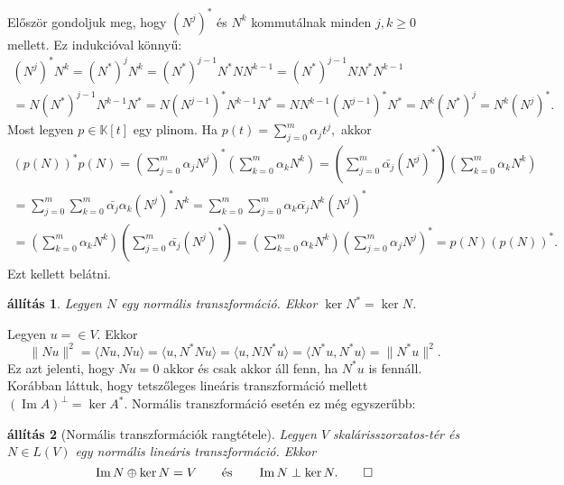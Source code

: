 \documentclass[9pt, a4paper, showtrims]{memoir}
\makeatletter
\renewenvironment{proof}[1][\proofname]
    {\par\pushQED{\qed}%
    \normalfont \topsep6\p@\@plus6\p@\relax
    \trivlist
    \item[\hskip\labelsep
        \itshape
    #1\@addpunct{:}]\ignorespaces}
    {\popQED\endtrivlist\@endpefalse}
\theoremstyle{plain}
\newtheorem{proposition}{állítás}[chapter]
\theoremstyle{remark}
\theoremstyle{definition}
\DeclareMathOperator{\im}{Im}
\newcommand{\ip}[2]{\langle#1,#2\rangle}
\makeatother
\begin{document}
\begin{proof}
    Először gondoljuk meg, hogy $(N^j)^\ast$ és $N^k$ kommutálnak minden $j,k≥0$ mellett.
    Ez indukcióval könnyű:
    \begin{multline*}
        (N^j)^\ast N^k
        =
        (N^\ast)^jN^k
        =
        (N^\ast)^{j-1}N^\ast NN^{k-1}
        =
        (N^\ast)^{j-1}NN^\ast N^{k-1}
        \\
        =
        N(N^\ast)^{j-1}N^{k-1}N^\ast
        =
        N(N^{j-1})^\ast N^{k-1}N^\ast
        =
        NN^{k-1}(N^{j-1})^\ast N^\ast
        =
        N^k(N^\ast)^j
        =
        N^k(N^j)^\ast.
    \end{multline*}
    Most legyen $p\in \mathbb{K}[t]$ egy plinom.
    Ha $p\left( t \right)=\sum_{j=0}^m\alpha_jt^j,$
    akkor
    \begin{multline*}
        \left( p\left( N \right) \right)^\ast p\left( N \right)
        =
        \left( \sum_{j=0}^m\alpha_jN^j \right)^\ast
         \left( \sum_{k=0}^m\alpha_kN^k \right)
        =
        \left( \sum_{j=0}^m\bar{\alpha_j}(N^j)^\ast \right)
        \left( \sum_{k=0}^m\alpha_kN^k \right)
        \\
        =
        \sum_{j=0}^m\sum_{k=0}^m\bar{\alpha_j}\alpha_k(N^j)^\ast N^k
        =
        \sum_{k=0}^m\sum_{j=0}^m\alpha_k\bar{\alpha_j}N^k(N^j)^\ast
        \\
        =
        \left( \sum_{k=0}^m\alpha_kN^k \right)
        \left( \sum_{j=0}^m\bar{\alpha_j}(N^j)^\ast \right)
        =
        \left( \sum_{k=0}^m\alpha_kN^k \right)
        \left( \sum_{j=0}^m\alpha_jN^j\right)^\ast
        =
        p\left( N \right)\left( p\left( N \right) \right)^\ast.
    \end{multline*}
    Ezt kellett belátni. 
\end{proof}
\begin{proposition}
    Legyen $N$ egy normális transzformáció. 
    Ekkor $\ker N^\ast=\ker N$.
\end{proposition}
\begin{proof}
    Legyen $u=\in V.$
    Ekkor 
    \[
        \|Nu\|^2
        =
        \ip{Nu}{Nu}
        =
        \ip{u}{N^\ast Nu}
        =
        \ip{u}{NN^\ast u}
        =
        \ip{N^\ast u}{N^\ast u}
        =
        \|N^\ast u\|^2.
    \]
    Ez azt jelenti, hogy $Nu=0$ akkor és csak akkor áll fenn, 
    ha $N^\ast u$ is fennáll.
\end{proof}
Korábban láttuk, 
hogy tetszőleges lineáris transzformáció mellett $(\im A)^\perp=\ker A^\ast.$
Normális transzformáció esetén ez még egyszerűbb:
\begin{proposition}[Normális transzformációk rangtétele]\label{pr:normalisrang}
    Legyen $V$ skalárisszorzatos-tér és $N\in L\left( V \right)$ egy normális lineáris transzformáció.
    Ekkor 
    \[
        \im N\oplus\ker N=V\qquad\text{és}\qquad \im N\perp \ker N.
        \qedhere
    \]
\end{proposition}
\end{document}
